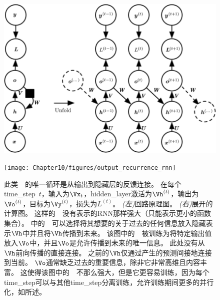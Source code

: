 \begin{figure}[!htb]
\ifOpenSource
\centerline{\includegraphics[scale=0.5]{images/92.png}}
\else
\centerline{\texttt{[image: Chapter10/figures/output\_recurrence\_rnn]}}
\fi
\caption{此类~~的唯一循环是从输出到隐藏层的反馈连接。
在每个\gls{time_step}~$t$，输入为$\Vx_t$，\gls{hidden_layer}激活为$\Vh^{(t)}$，输出为$\Vo^{(t)}$，目标为$\Vy^{(t)}$，损失为$L^{(t)}$。
\emph{(左)}回路原理图。
\emph{(右)}展开的计算图。
这样的~~没有表示的RNN那样强大（只能表示更小的函数集合）。
中的~~可以选择将其想要的关于过去的任何信息放入隐藏表示$\Vh$中并且将$\Vh$传播到未来。
该图中的~~被训练为将特定输出值放入$\Vo$中，并且$\Vo$是允许传播到未来的唯一信息。
此处没有从$\Vh$前向传播的直接连接。
之前的$\Vh$仅通过产生的预测间接地连接到当前。
$\Vo$通常缺乏过去的重要信息，除非它非常高维且内容丰富。
这使得该图中的~~不那么强大，但是它更容易训练，因为每个\gls{time_step}可以与其他\gls{time_step}分离训练，允许训练期间更多的并行化，如所述。
}
\label{fig:chap10_output_recurrence_rnn}
\end{figure}

